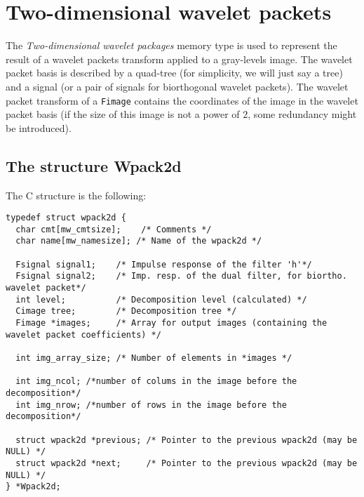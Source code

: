 \section{Two-dimensional wavelet packets}


\label{wavelets_wpack2d}

The {\em Two-dimensional wavelet packages}  memory type is used to represent the result
of a wavelet packets transform applied to a gray-levels image.
The wavelet packet basis is described by a quad-tree
(for simplicity, we will just say a tree) and a signal (or a pair of signals for biorthogonal wavelet packets). 
The wavelet packet transform of a \verb+Fimage+ contains the coordinates of the image in the wavelet packet basis
(if the size of this image is not a power of $2$, some redundancy might be introduced).

\subsection{The structure Wpack2d}
\label{wavelets_wpack2d_structure}

\def\wpackdd{{\tt Wpack2d }}
\index{structure!\wpack2d@\wpackdd}

The C structure is the following:
{\small
\begin{verbatim}
typedef struct wpack2d {
  char cmt[mw_cmtsize];    /* Comments */
  char name[mw_namesize]; /* Name of the wpack2d */

  Fsignal signal1;    /* Impulse response of the filter 'h'*/
  Fsignal signal2;    /* Imp. resp. of the dual filter, for biortho. wavelet packet*/
  int level;          /* Decomposition level (calculated) */
  Cimage tree;        /* Decomposition tree */
  Fimage *images;     /* Array for output images (containing the wavelet packet coefficients) */
 
  int img_array_size; /* Number of elements in *images */
   
  int img_ncol; /*number of colums in the image before the decomposition*/
  int img_nrow; /*number of rows in the image before the decomposition*/

  struct wpack2d *previous; /* Pointer to the previous wpack2d (may be NULL) */ 
  struct wpack2d *next;     /* Pointer to the previous wpack2d (may be NULL) */
} *Wpack2d;
\end{verbatim}
}

